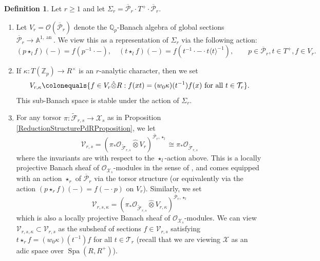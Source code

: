 \documentclass[10pt, oneside]{amsart}
\newcommand{\defeq}{\colonequals}
\renewcommand{\tilde}{\widetilde}
\numberwithin{equation}{subsection}
\theoremstyle{definition}
\newtheorem{definition}[equation]{Definition}
\theoremstyle{remark}
\newcommand{\mbb}[1]{\mathbb{#1}}
\newcommand{\hatot}{\hat{\otimes}}
\newcommand{\opn}[1]{\operatorname{#1}}
\begin{document}
\begin{definition} \label{DefinitionOfVrwithmonoidaction}
    Let $r \geq 1$ and let $\Sigma_r = \mathcal{\overline{P}}_r \cdot T^+ \cdot \mathcal{\overline{P}}_r$.
    \begin{enumerate}
        \item Let $V_r = \mathcal{O}(\overline{\mathcal{P}}_r)$ denote the $\mbb{Q}_p$-Banach algebra of global sections $\overline{\mathcal{P}}_r \to \mbb{A}^{1, \opn{an}}$. We view this as a representation of $\Sigma_r$ via the following action:
        \[
        (p \star_l f)(-) = f(p^{-1} \cdot -), \quad ( t \star_l f)(-) = f(t^{-1} \cdot - \cdot t\langle t \rangle^{-1}), \quad \quad p \in \overline{\mathcal{P}}_r, t \in T^+, f \in V_r .
        \]
        \item If $\kappa \colon T(\mbb{Z}_p) \to R^{\times}$ is an $r$-analytic character, then we set 
        \[
        V_{r, \kappa} \defeq \{ f \in V_r\hatot R : f(x t) = (w_0\kappa)(t^{-1}) f(x) \text{ for all } t \in \mathcal{T}_r \} .
        \]
        This sub-Banach space is stable under the action of $\Sigma_r$. 
        \item For any torsor $\pi \colon \tilde{\mathcal{F}}_{r, s} \to \mathcal{X}_s$ as in Proposition \ref{ReductionStructurePdRProposition}, we let 
        \[
        \mathcal{V}_{r, s} = \left( \pi_*\mathcal{O}_{\tilde{\mathcal{F}}_{r, s}} \hatot V_r \right)^{\overline{\mathcal{P}}_r, \star_l} \cong \pi_*\mathcal{O}_{\tilde{\mathcal{F}}_{r, s}}
        \]
        where the invariants are with respect to the $\star_l$-action above. This is a locally projective Banach sheaf of $\mathcal{O}_{\mathcal{X}_s}$-modules in the sense of \cite[Definition 2.5.2]{BPHCT}, and comes equipped with an action $\star_r$ of $\overline{\mathcal{P}}_r$ via the torsor structure (or equivalently via the action $(p \star_r f)(-) = f(- \cdot p)$ on $V_r$). Similarly, we set 
        \[
        \mathcal{V}_{r, s, \kappa} = \left( \pi_*\mathcal{O}_{\tilde{\mathcal{F}}_{r, s}} \hatot V_{r, \kappa} \right)^{\overline{\mathcal{P}}_r, \star_l}
        \]
        which is also a locally projective Banach sheaf of $\mathcal{O}_{\mathcal{X}_s}$-modules. We can view $\mathcal{V}_{r, s, \kappa} \subset \mathcal{V}_{r, s}$ as the subsheaf of sections $f \in \mathcal{V}_{r, s}$ satisfying $t \star_r f = (w_0\kappa)(t^{-1}) f$ for all $t \in \mathcal{T}_r$ (recall that we are viewing $\mathcal{X}$ as an adic space over $\opn{Spa}(R, R^+)$). 
    \end{enumerate}
\end{definition}
\end{document}
